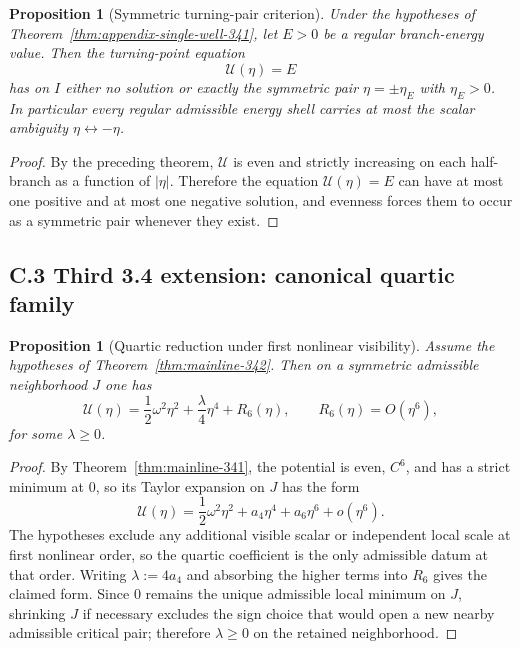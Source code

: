 \documentclass[12pt,a4paper]{article}
\newtheorem{proposition}[theorem]{Proposition}
\begin{document}
\begin{proposition}[Symmetric turning-pair criterion]
\label{prop:symmetric-turning-pair-341}
Under the hypotheses of Theorem~\ref{thm:appendix-single-well-341}, let $E>0$ be a regular branch-energy value. Then the turning-point equation
\[
 \mathcal U(\eta)=E
\]
has on $I$ either no solution or exactly the symmetric pair $\eta=\pm\eta_E$ with $\eta_E>0$. In particular every regular admissible energy shell carries at most the scalar ambiguity $\eta\leftrightarrow-\eta$.
\end{proposition}

\begin{proof}
By the preceding theorem, $\mathcal U$ is even and strictly increasing on each half-branch as a function of $|\eta|$. Therefore the equation $\mathcal U(\eta)=E$ can have at most one positive and at most one negative solution, and evenness forces them to occur as a symmetric pair whenever they exist.
\end{proof}

\subsection*{C.3 Third 3.4 extension: canonical quartic family}

\begin{proposition}[Quartic reduction under first nonlinear visibility]
\label{prop:appendix-342a}
Assume the hypotheses of Theorem~\ref{thm:mainline-342}. Then on a symmetric admissible neighborhood $J$ one has
\[
 \mathcal U(\eta)=\frac12\omega^2\eta^2+\frac{\lambda}{4}\eta^4+R_6(\eta),
 \qquad R_6(\eta)=O(\eta^6),
\]
for some $\lambda\ge 0$.
\end{proposition}

\begin{proof}
By Theorem~\ref{thm:mainline-341}, the potential is even, $C^6$, and has a strict minimum at $0$, so its Taylor expansion on $J$ has the form
\[
 \mathcal U(\eta)=\frac12\omega^2\eta^2+a_4\eta^4+a_6\eta^6+o(\eta^6).
\]
The hypotheses exclude any additional visible scalar or independent local scale at first nonlinear order, so the quartic coefficient is the only admissible datum at that order. Writing $\lambda:=4a_4$ and absorbing the higher terms into $R_6$ gives the claimed form. Since $0$ remains the unique admissible local minimum on $J$, shrinking $J$ if necessary excludes the sign choice that would open a new nearby admissible critical pair; therefore $\lambda\ge 0$ on the retained neighborhood.
\end{proof}
\end{document}
